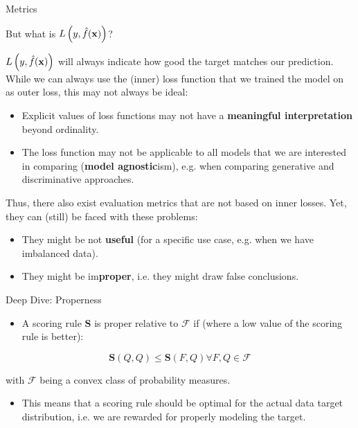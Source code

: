 \documentclass[11pt,compress,t,notes=noshow, xcolor=table]{beamer}
\begin{document}
\begin{vbframe}{Metrics}

But what is $L\left(y, \hat{f}(\mathbf{x})\right)$?
\vspace{0.2cm}

$L\left(y, \hat{f}(\mathbf{x})\right)$ will always indicate how good the target matches our prediction.
While we can always use the (inner) loss function that we trained the model on as outer loss, this may not always be ideal:

\begin{itemize}
\item Explicit values of loss functions may not have a \textbf{meaningful interpretation} beyond ordinality.
\item The loss function may not be applicable to all models that we are interested in comparing (\textbf{model agnostic}ism), e.g. when comparing generative and discriminative approaches.
\end{itemize}

Thus, there also exist evaluation metrics that are not based on inner losses.
Yet, they can (still) be faced with these problems:

\begin{itemize}
\item They might be not \textbf{useful} (for a specific use case, e.g. when we have imbalanced data).
\item They might be im\textbf{proper}, i.e. they might draw false conclusions.
\end{itemize}

\end{vbframe}

\begin{vbframe}{Deep Dive: Properness}



\begin{itemize}


\item A scoring rule $\mathbf{S}$  is proper relative to $\mathcal {F}$ if (where a low value of the scoring rule is better):
\end{itemize} 

$$\mathbf {S} (Q,Q) \leq \mathbf {S} (F,Q) \forall F,Q \in \mathcal {F}$$

with $\mathcal{F}$ being a convex class of probability measures.

\begin{itemize}
\item This means that a scoring rule should be optimal for the actual data target distribution, i.e. we are rewarded for properly modeling the target.
\end{itemize}

\end{vbframe}
\end{document}

